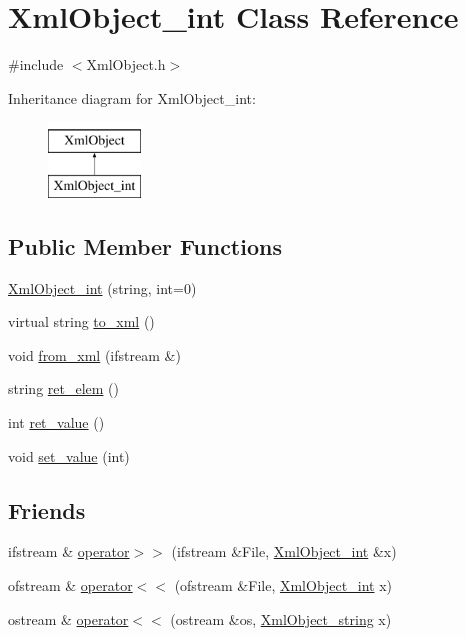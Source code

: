 \hypertarget{classXmlObject__int}{\section{Xml\-Object\-\_\-int Class Reference}
\label{classXmlObject__int}
}


{\ttfamily \#include $<$Xml\-Object.\-h$>$}

Inheritance diagram for Xml\-Object\-\_\-int\-:\begin{figure}[H]
\begin{center}
\leavevmode
\includegraphics[height=2.000000cm]{classXmlObject__int}
\end{center}
\end{figure}
\subsection*{Public Member Functions}
\begin{DoxyCompactItemize}
\item 
\hyperlink{classXmlObject__int_a20c9fc3a3785e8c4c07f7b2ac86a4cbd}{Xml\-Object\-\_\-int} (string, int=0)
\item 
virtual string \hyperlink{classXmlObject__int_a071bc574f78dfbb6824cc5a1c5a1e4d7}{to\-\_\-xml} ()
\item 
void \hyperlink{classXmlObject__int_a1638d6bef2ad920f60a633f8fd580ab0}{from\-\_\-xml} (ifstream \&)
\item 
string \hyperlink{classXmlObject__int_a4775d210333968667b9a533fcf2ab1df}{ret\-\_\-elem} ()
\item 
int \hyperlink{classXmlObject__int_a2c5b3031f04cc9ed0b343ab057aa0022}{ret\-\_\-value} ()
\item 
void \hyperlink{classXmlObject__int_a70573ff274498cd00ce2ed54e4391f7f}{set\-\_\-value} (int)
\end{DoxyCompactItemize}
\subsection*{Friends}
\begin{DoxyCompactItemize}
\item 
ifstream \& \hyperlink{classXmlObject__int_af6602349819f033b38c8214cbdaf1806}{operator$>$$>$} (ifstream \&File, \hyperlink{classXmlObject__int}{Xml\-Object\-\_\-int} \&x)
\item 
ofstream \& \hyperlink{classXmlObject__int_a6c347c380c359066d322373333dc88b7}{operator$<$$<$} (ofstream \&File, \hyperlink{classXmlObject__int}{Xml\-Object\-\_\-int} x)
\item 
ostream \& \hyperlink{classXmlObject__int_a47a42d8624b5b6ce6252d2cf6a815b8a}{operator$<$$<$} (ostream \&os, \hyperlink{classXmlObject__string}{Xml\-Object\-\_\-string} x)
\end{DoxyCompactItemize}
